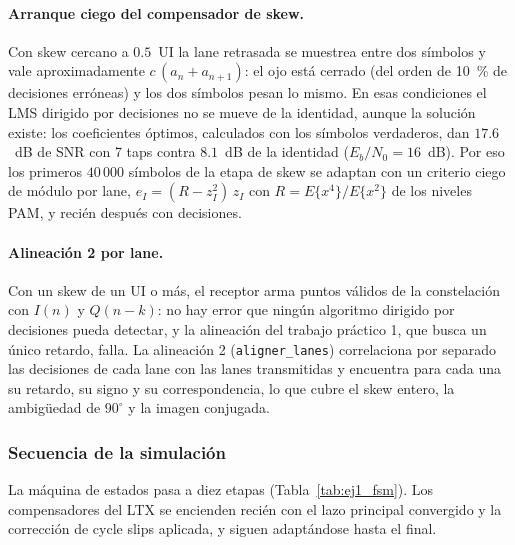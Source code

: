 \paragraph{Arranque ciego del compensador de skew.}
Con skew cercano a $0.5$~UI la lane retrasada se muestrea entre dos
símbolos y vale aproximadamente $c\,(a_n + a_{n+1})$: el ojo está cerrado
(del orden de 10~\% de decisiones erróneas) y los dos símbolos pesan lo
mismo. En esas condiciones el LMS dirigido por decisiones no se mueve de
la identidad, aunque la solución existe: los coeficientes óptimos,
calculados con los símbolos verdaderos, dan $17.6$~dB de SNR con 7 taps
contra $8.1$~dB de la identidad ($E_b/N_0 = 16$~dB). Por eso los primeros
$40\,000$ símbolos de la etapa de skew se adaptan con un criterio ciego
de módulo por lane, $e_I = (R - z_I^2)\,z_I$ con $R =
E\{x^4\}/E\{x^2\}$ de los niveles PAM, y recién después con decisiones.

\paragraph{Alineación 2 por lane.}
Con un skew de un UI o más, el receptor arma puntos válidos de la
constelación con $I(n)$ y $Q(n-k)$: no hay error que ningún algoritmo
dirigido por decisiones pueda detectar, y la alineación del trabajo
práctico 1, que busca un único retardo, falla. La alineación 2
(\texttt{aligner\_lanes}) correlaciona por separado las decisiones de cada
lane con las lanes transmitidas y encuentra para cada una su retardo, su
signo y su correspondencia, lo que cubre el skew entero, la ambigüedad
de $90^\circ$ y la imagen conjugada.

\subsubsection*{Secuencia de la simulación}

La máquina de estados pasa a diez etapas (Tabla~\ref{tab:ej1_fsm}). Los
compensadores del LTX se encienden recién con el lazo principal
convergido y la corrección de cycle slips aplicada, y siguen adaptándose
hasta el final.

